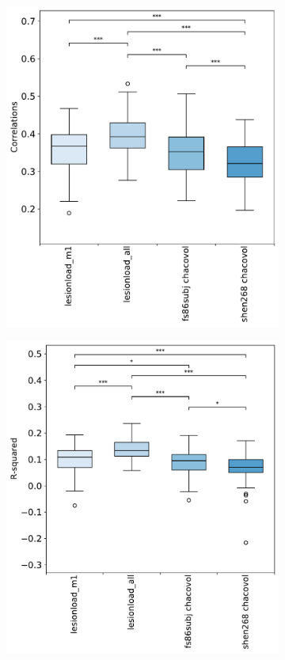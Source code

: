 \documentclass[10pt]{article}
\begin{document}
\begin{figure}
\begin{subfigure}{0.5\textwidth}
  \centering
  \includegraphics[width=1\linewidth]{figures/analysis_2_boxplots_correlations.pdf}
  \caption{}
  \label{fig:sfig1}
\end{subfigure}
\begin{subfigure}{0.5\textwidth}
  \centering
  \includegraphics[width=1\linewidth]{figures/analysis_2_boxplots_rsquared.pdf}

\end{subfigure}
\end{figure}
\end{document}
